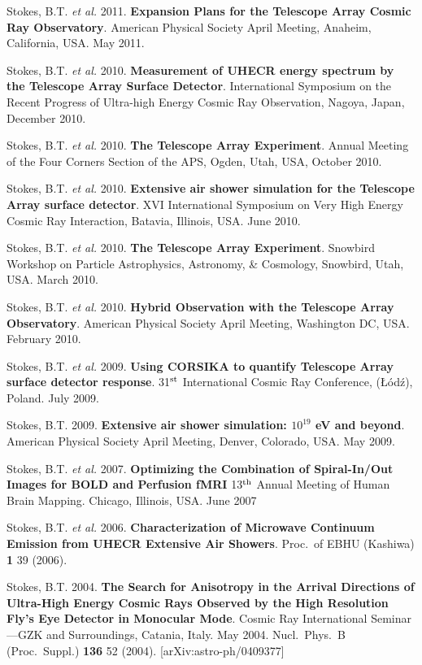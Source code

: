 \begin{resume}
Stokes, B.T. {\it et al.} 2011. {\bf Expansion Plans for the Telescope Array Cosmic Ray Observatory}. American Physical Society April Meeting, Anaheim, California, USA. May 2011.

Stokes, B.T. {\it et al.} 2010.  {\bf Measurement of UHECR energy spectrum by the Telescope Array Surface Detector}. International Symposium on the Recent Progress of Ultra-high Energy Cosmic Ray Observation, Nagoya, Japan, December 2010.

Stokes, B.T. {\it et al.} 2010.  {\bf The Telescope Array Experiment}. Annual Meeting of the Four Corners Section of the APS, Ogden, Utah, USA, October 2010.

Stokes, B.T. {\it et al.} 2010. {\bf Extensive air shower simulation for the Telescope Array surface detector}. XVI International Symposium on Very High Energy Cosmic Ray Interaction, Batavia, Illinois, USA.  June 2010.

Stokes, B.T. {\it et al.} 2010. {\bf The Telescope Array Experiment}. Snowbird
Workshop on Particle Astrophysics, Astronomy, \& Cosmology, Snowbird, Utah, USA.
March 2010.

Stokes, B.T. {\it et al.} 2010. {\bf Hybrid Observation with the Telescope Array Observatory}. American Physical Society April Meeting, Washington DC, USA.
February 2010.

Stokes, B.T. {\it et al.} 2009. {\bf Using CORSIKA to quantify Telescope
Array surface detector response}. 31$^{\rm st}$ International Cosmic Ray
Conference, (\L\'od\'z), Poland. July 2009.

Stokes, B.T.  2009.  {\bf Extensive air shower simulation: \boldmath$10^{19}$ eV
and beyond}. American Physical Society April Meeting, Denver, Colorado, USA.
May 2009.

Stokes, B.T. {\it et al.} 2007. {\bf Optimizing the Combination of
Spiral-In/Out Images for BOLD and Perfusion fMRI} 13$^{\rm th}$ Annual Meeting
of Human Brain Mapping.  Chicago, Illinois, USA.  June 2007

Stokes, B.T. {\it et al.}  2006.
{\bf Characterization of Microwave Continuum Emission from UHECR Extensive Air
Showers}. Proc.\ of EBHU (Kashiwa) {\bf 1} 39 (2006).

Stokes, B.T.  2004.  {\bf The Search for Anisotropy in the Arrival
Directions of Ultra-High Energy Cosmic Rays Observed by the High Resolution
Fly's Eye Detector in Monocular Mode}.
Cosmic Ray International Seminar---GZK and Surroundings, Catania, Italy.
May 2004. Nucl.\ Phys.\ B (Proc.\ Suppl.) {\bf 136} 52 (2004).
[arXiv:astro-ph/0409377]


\end{resume}
